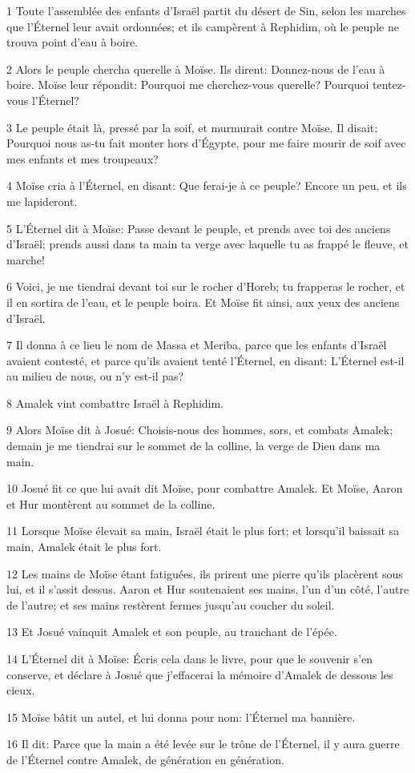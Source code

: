 \par 1 Toute l'assemblée des enfants d'Israël partit du désert de Sin, selon les marches que l'Éternel leur avait ordonnées; et ils campèrent à Rephidim, où le peuple ne trouva point d'eau à boire.
\par 2 Alors le peuple chercha querelle à Moïse. Ils dirent: Donnez-nous de l'eau à boire. Moïse leur répondit: Pourquoi me cherchez-vous querelle? Pourquoi tentez-vous l'Éternel?
\par 3 Le peuple était là, pressé par la soif, et murmurait contre Moïse. Il disait: Pourquoi nous as-tu fait monter hors d'Égypte, pour me faire mourir de soif avec mes enfants et mes troupeaux?
\par 4 Moïse cria à l'Éternel, en disant: Que ferai-je à ce peuple? Encore un peu, et ils me lapideront.
\par 5 L'Éternel dit à Moïse: Passe devant le peuple, et prends avec toi des anciens d'Israël; prends aussi dans ta main ta verge avec laquelle tu as frappé le fleuve, et marche!
\par 6 Voici, je me tiendrai devant toi sur le rocher d'Horeb; tu frapperas le rocher, et il en sortira de l'eau, et le peuple boira. Et Moïse fit ainsi, aux yeux des anciens d'Israël.
\par 7 Il donna à ce lieu le nom de Massa et Meriba, parce que les enfants d'Israël avaient contesté, et parce qu'ils avaient tenté l'Éternel, en disant: L'Éternel est-il au milieu de nous, ou n'y est-il pas?
\par 8 Amalek vint combattre Israël à Rephidim.
\par 9 Alors Moïse dit à Josué: Choisis-nous des hommes, sors, et combats Amalek; demain je me tiendrai sur le sommet de la colline, la verge de Dieu dans ma main.
\par 10 Josué fit ce que lui avait dit Moïse, pour combattre Amalek. Et Moïse, Aaron et Hur montèrent au sommet de la colline.
\par 11 Lorsque Moïse élevait sa main, Israël était le plus fort; et lorsqu'il baissait sa main, Amalek était le plus fort.
\par 12 Les mains de Moïse étant fatiguées, ils prirent une pierre qu'ils placèrent sous lui, et il s'assit dessus. Aaron et Hur soutenaient ses mains, l'un d'un côté, l'autre de l'autre; et ses mains restèrent fermes jusqu'au coucher du soleil.
\par 13 Et Josué vainquit Amalek et son peuple, au tranchant de l'épée.
\par 14 L'Éternel dit à Moïse: Écris cela dans le livre, pour que le souvenir s'en conserve, et déclare à Josué que j'effacerai la mémoire d'Amalek de dessous les cieux.
\par 15 Moïse bâtit un autel, et lui donna pour nom: l'Éternel ma bannière.
\par 16 Il dit: Parce que la main a été levée sur le trône de l'Éternel, il y aura guerre de l'Éternel contre Amalek, de génération en génération.

